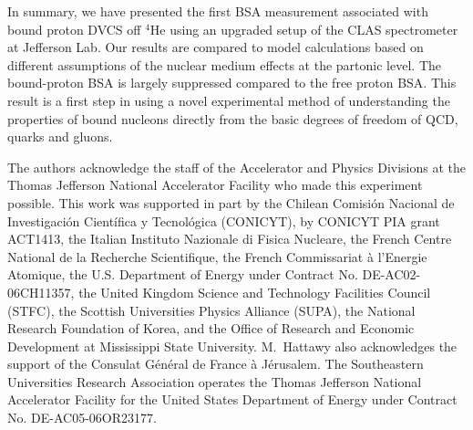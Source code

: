 \documentclass[twocolumn,nofootinbib,showpacs,prl,superscriptaddress,secnumarabic,amssymb,nobibnotes,aps,floatfix]{revtex4}
\begin{document}
In summary, we have presented the first BSA measurement associated with bound 
proton DVCS off $^4$He using an upgraded setup of the CLAS spectrometer at 
Jefferson Lab. Our results are compared to model calculations based on 
different assumptions of the nuclear medium effects at the partonic level. The 
bound-proton BSA is largely suppressed compared to the free proton BSA. This 
result is a first step in using a novel experimental method of understanding 
the properties of bound nucleons directly from the basic degrees of freedom of 
QCD, quarks and gluons.


The authors acknowledge the staff of the Accelerator and Physics Divisions at 
the Thomas Jefferson National Accelerator Facility who made this experiment 
possible. This work was supported in part by the Chilean Comisi\'on Nacional de 
Investigaci\'on Cient\'ifica y Tecnol\'ogica (CONICYT), by CONICYT PIA grant 
ACT1413, the Italian Instituto Nazionale di Fisica Nucleare, the French Centre 
National de la Recherche Scientifique, the French Commissariat \`a l'Energie 
Atomique, the U.S.  Department of Energy under Contract No. DE-AC02-06CH11357, 
the United Kingdom Science and Technology Facilities Council (STFC), the 
Scottish Universities Physics Alliance (SUPA), the National Research Foundation 
of Korea, and the Office of Research and Economic Development at Mississippi 
State University.  M.~Hattawy also acknowledges the support of the Consulat 
G\'en\'eral de France \`a J\'erusalem.  The Southeastern Universities Research 
Association operates the Thomas Jefferson National Accelerator Facility for the 
United States Department of Energy under Contract No. DE-AC05-06OR23177.
\end{document}
